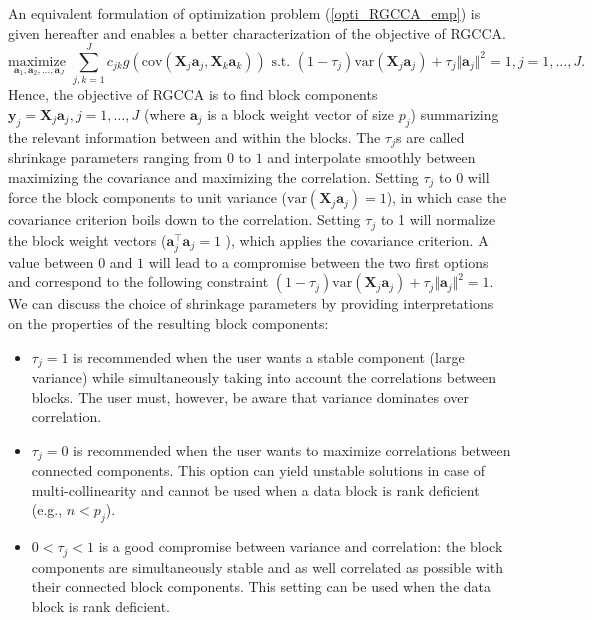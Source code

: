 \documentclass[
]{jss}
\begin{document}
An equivalent formulation of optimization problem (\ref{opti_RGCCA_emp})
is given hereafter and enables a better characterization of the
objective of RGCCA. \begin{equation}
\displaystyle \underset{\mathbf{a}_1,\mathbf{a}_2, \ldots,\mathbf{a}_J}{\text{maximize }} \sum_{j, k = 1}^J c_{jk}g(\mathrm{cov}(\mathbf{X}_j\mathbf{a}_j, \mathbf{X}_k\mathbf{a}_k)) \text{ s.t. } (1-\tau_j)\mathrm{var}(\mathbf{X}_j\mathbf{a}_j) + \tau_j\Vert \mathbf{a}_j \Vert^2 = 1, j=1, \ldots,J.
\label{optim_RGCCA}
\end{equation} Hence, the objective of RGCCA is to find block components
\(\mathbf y_j = \mathbf X_j \mathbf a_j, j = 1, \ldots, J\) (where
\(\mathbf a_j\) is a block weight vector of size \(p_j\)) summarizing
the relevant information between and within the blocks. The \(\tau_j\)s
are called shrinkage parameters ranging from \(0\) to \(1\) and
interpolate smoothly between maximizing the covariance and maximizing
the correlation. Setting \(\tau_j\) to 0 will force the block components
to unit variance (\(\mathrm{var}(\mathbf{X}_j\mathbf{a}_j) = 1\)), in
which case the covariance criterion boils down to the correlation.
Setting \(\tau_j\) to 1 will normalize the block weight vectors
(\(\mathbf{a}_j^\top\mathbf{a}_j = 1\) ), which applies the covariance
criterion. A value between \(0\) and \(1\) will lead to a compromise
between the two first options and correspond to the following constraint
\((1-\tau_j)\mathrm{var}(\mathbf{X}_j\mathbf{a}_j) + \tau_j \Vert \mathbf{a}_j \Vert^2 = 1\).
We can discuss the choice of shrinkage parameters by providing
interpretations on the properties of the resulting block components:

\begin{itemize}
\item   $\tau_j=1$ is recommended when the user wants a stable component (large 
variance) while simultaneously taking into account the correlations between 
blocks. The user must, however, be aware that variance dominates over 
correlation.

\item   $\tau_j=0$ is recommended when the user wants to maximize correlations 
between connected components. This option can yield unstable solutions in case 
of multi-collinearity and cannot be used when a data block is rank deficient 
(e.g., $n<p_j$).

\item   $0<\tau_j<1$ is a good compromise between variance and correlation: the 
block components are simultaneously stable and as well correlated as possible 
with their connected block components. This setting can be used when the data 
block is rank deficient.
\end{itemize}
\end{document}
